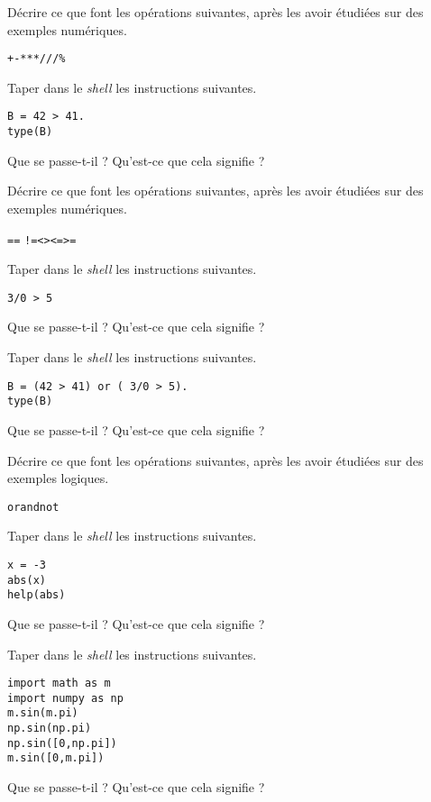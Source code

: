 \medskip{}

\question{} Décrire ce que font les opérations suivantes, après les avoir étudiées sur des exemples numériques.
\begin{center}
  \texttt{+}\qquad \texttt{-}\qquad \texttt{*}\qquad \texttt{**}\qquad \texttt{/}\qquad \texttt{//}\qquad \texttt{\%}
\end{center}


\question{} Taper dans le \emph{shell} les instructions suivantes. 
\begin{verbatim}
B = 42 > 41.
type(B)
\end{verbatim}
Que se passe-t-il ? Qu'est-ce que cela signifie ?

\medskip{}

\question{} Décrire ce que font les opérations suivantes, après les avoir étudiées sur des exemples numériques.
\begin{center}
  \texttt{==} {} \qquad{} \texttt{!=}\qquad\texttt{<}\qquad\texttt{>}\qquad\texttt{<=}\qquad\texttt{>=}
\end{center}

\medskip{}

\question{} Taper dans le \emph{shell} les instructions suivantes. 
\begin{verbatim}
3/0 > 5
\end{verbatim}
Que se passe-t-il ? Qu'est-ce que cela signifie ?
\medskip{}

\question{} Taper dans le \emph{shell} les instructions suivantes. 
\begin{verbatim}
B = (42 > 41) or ( 3/0 > 5).
type(B)
\end{verbatim}
Que se passe-t-il ? Qu'est-ce que cela signifie ?

\medskip{}

\question{} Décrire ce que font les opérations suivantes, après les avoir étudiées sur des exemples logiques.
\begin{center}
  \texttt{or}\qquad\texttt{and}\qquad\texttt{not}
\end{center}


\medskip{}

\question{} Taper dans le \emph{shell} les instructions suivantes. 
\begin{verbatim}
x = -3
abs(x)
help(abs)
\end{verbatim}
Que se passe-t-il ? Qu'est-ce que cela signifie ?

\medskip{}

\question{} Taper dans le \emph{shell} les instructions suivantes. 
\begin{verbatim}
import math as m
import numpy as np
m.sin(m.pi)
np.sin(np.pi)
np.sin([0,np.pi])
m.sin([0,m.pi])
\end{verbatim}
Que se passe-t-il ? Qu'est-ce que cela signifie ?


